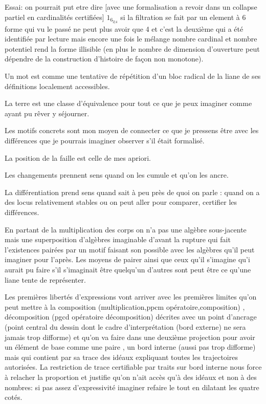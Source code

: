 \documentclass{article}
\begin{document}
Essai: on pourrait put etre dire [avec une formalisation a revoir dans un collapse partiel en cardinalités certifiées] $1_{6_{2|4}}$ si la filtration se fait par un element à 6 forme qui vu le passé ne peut plus avoir que 4 et  c'est la deuxième qui a été identifiée par lecture mais encore une fois le mélange nombre cardinal et nombre potentiel rend la forme illisible (en plus le nombre de dimension d'ouverture peut dépendre de la construction d'histoire de façon non monotone). 
 
 Un mot est comme une tentative de répétition d'un bloc radical de la liane de ses définitions localement accessibles.
 
 La terre est une classe d'équivalence pour tout ce que je peux imaginer comme ayant pu rêver y séjourner.
 
 Les motifs concrets sont mon moyen de connecter ce que je pressens être  avec les différences que je pourrais imaginer observer s'il était formalisé.
 
 La position de la faille est celle de mes apriori.
 
 Les changements prennent sens quand on les cumule et qu'on les ancre.
 
 La différentiation prend sens quand sait à peu près de quoi on parle : quand on a des locus relativement stables ou on peut aller pour comparer, certifier les différences.
  
  En partant de la multiplication des corps on n'a pas une algèbre sous-jacente mais une superposition d'algèbres imaginable d'avant la rupture qui fait l'existences pairées par un motif faisant son possible avec les algèbres qu'il peut imaginer pour l'après. Les moyens de pairer ainsi que ceux qu'il s'imagine qu'i aurait pu faire s'il s'imaginait être quelqu'un d'autres sont peut être  ce qu'une liane tente de représenter.
  
  Les premières libertés d'expressions vont arriver avec les premières limites qu'on peut mettre à la composition (multiplication,ppcm opératoire,composition) , décomposition (pgcd opératoire décomposition) décrites avec un point d'ancrage (point central du dessin dont le cadre d'interprétation (bord externe)  ne sera jamais trop difforme) et qu'on va faire dans une deuxième projection pour avoir un élément de base comme une paire , un  bord interne (aussi pas trop difforme) mais qui contient par sa trace des idéaux expliquant toutes les trajectoires autorisées. La restriction de trace certifiable par traits sur bord interne nous force à relacher la proportion et justifie qu'on n'ait accès qu'à des idéaux et non à des nombres: si pas assez d'expressivité imaginer refaire le tout en dilatant les quatre cotés.
  
\end{document}
